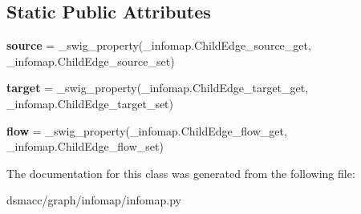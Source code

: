 \subsection*{Static Public Attributes}
\begin{DoxyCompactItemize}
\item 
\mbox{\label{classdsmacc_1_1graph_1_1infomap_1_1infomap_1_1ChildEdge_a6e8dd9cd16a75463babb3dc2a2ee5505}} 
{\bfseries source} = \+\_\+swig\+\_\+property(\+\_\+infomap.\+Child\+Edge\+\_\+source\+\_\+get, \+\_\+infomap.\+Child\+Edge\+\_\+source\+\_\+set)
\item 
\mbox{\label{classdsmacc_1_1graph_1_1infomap_1_1infomap_1_1ChildEdge_a7512c948035a96022195ba133b2e374c}} 
{\bfseries target} = \+\_\+swig\+\_\+property(\+\_\+infomap.\+Child\+Edge\+\_\+target\+\_\+get, \+\_\+infomap.\+Child\+Edge\+\_\+target\+\_\+set)
\item 
\mbox{\label{classdsmacc_1_1graph_1_1infomap_1_1infomap_1_1ChildEdge_a2bcd03ee7a57334f123f95288e119222}} 
{\bfseries flow} = \+\_\+swig\+\_\+property(\+\_\+infomap.\+Child\+Edge\+\_\+flow\+\_\+get, \+\_\+infomap.\+Child\+Edge\+\_\+flow\+\_\+set)
\end{DoxyCompactItemize}


The documentation for this class was generated from the following file\+:\begin{DoxyCompactItemize}
\item 
dsmacc/graph/infomap/infomap.\+py\end{DoxyCompactItemize}
